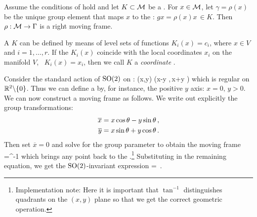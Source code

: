 \begin{theorem}
 Assume the conditions of  hold and
 let $K\subset\mathcal{M}$ be a {\slice}. For $x\in \mathcal{M}$, let
 $\gamma=\rho(x)$ be the unique group element that maps $x$
 to the {\slice}: $g x = \rho(x) x\, \in K$. Then
 $\rho:\mathcal{M}\rightarrow \Gamma$ is a right moving frame.
\end{theorem}

A {\slice} $K$ can be defined by means of level sets of
functions $K_i(x)=c_i$, where $x\in V$ and $i=1,\ldots,r$. If
the $K_i(x)$ coincide with the local coordinates $x_i$ on the
manifold $V$, \ie~$K_i(x)=x_i$, then we call $K$ a
\emph{coordinate \slice}.

\begin{example}
Consider the standard action of $\mathrm{SO}(2)$ on :
\beq
	(x,y) \mapsto (x\cos\theta -y \sin\theta,\,x\sin\theta +y \cos\theta )
\eeq
which is regular on $\mathbb{R}^{2}\backslash\{0\}$. Thus we can define
a {\slice} by, for instance, the
positive $y$ axis: $x=0,\,y>0$.
We can now construct a moving frame as follows. We write out
explicitly the group transformations:
\begin{subequations}
\begin{align}
 	\overline{x} &= x \cos\theta - y \sin\theta\label{eq:explSO2stnd1}\,, \\ 
	\overline{y} &= x \sin\theta + y \cos\theta\label{eq:explSO2stnd2}\,.
\end{align}
\end{subequations}
Then set $\overline{x}=0$ and solve  for the group
parameter to obtain the moving frame
\beq
	\theta=\tan^{-1}
	\label{eq:SO2stndMF}
\eeq
which brings any point  back to the {\slice}.\footnote{Implementation note: Here it is important that $\tan^{-1}$
distinguishes quadrants on the $(x,y)$ plane so that we get the correct geometric operation.} Substituting  in the remaining equation, we get
the $\mathrm{SO}(2)$-invariant expression
\beq
	 = \,.
\eeq
\end{example}

